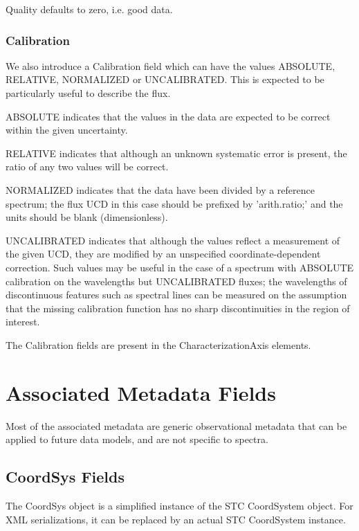 \documentclass[11pt]{article}
\begin{document}
Quality defaults to zero, i.e. good data.

\subsubsection{Calibration}

{We also introduce a Calibration field which can have
the values ABSOLUTE, RELATIVE, NORMALIZED or UNCALIBRATED. This is expected
to be particularly useful to describe the flux. 


ABSOLUTE indicates
that the values in the data are expected to be correct within the
given uncertainty. 

RELATIVE indicates that although an unknown
systematic error is present, the ratio of any two values will be
correct. 

NORMALIZED indicates that the data have been divided by a reference
spectrum; the flux UCD in this case should be prefixed by 'arith.ratio;' and
the units should be blank (dimensionless).

UNCALIBRATED indicates that although the values reflect a
measurement of the given UCD, they are modified by an unspecified
coordinate-dependent correction. Such values may be useful in the
case of a spectrum with ABSOLUTE calibration on the wavelengths
but UNCALIBRATED fluxes; the wavelengths of discontinuous features 
such as spectral lines can be
measured on the assumption that the missing calibration function
has no sharp discontinuities in the region of interest.
}

The Calibration fields are present in the CharacterizationAxis elements.



\clearpage

\section{Associated Metadata Fields}

Most of the associated metadata are generic observational
metadata that can be applied to future data models, and are
not specific to spectra.

\subsection{CoordSys Fields}

The CoordSys object is a simplified instance of the STC CoordSystem object.
For XML serializations, it can be replaced by an actual STC CoordSystem
instance.
\end{document}
